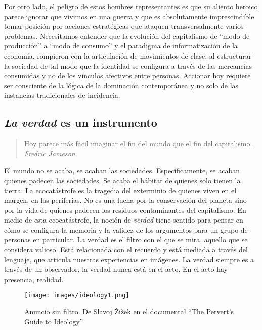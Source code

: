 Por otro lado, el peligro de estos hombres representantes es que su aliento heroico parece ignorar que vivimos en una guerra y que es absolutamente imprescindible tomar posición por acciones estratégicas que ataquen transversalmente varios problemas. Necesitamos entender que la evolución del capitalismo de \enquote{modo de producción}\revquotes{} a \enquote{modo de consumo}\revquotes{} y el paradigma de informatización de la economía, rompieron con la articulación de movimientos de clase, al estructurar la sociedad de tal modo que la identidad se configura a través de las mercancías consumidas y no de los vínculos afectivos entre personas. Accionar hoy requiere ser consciente de la lógica de la dominación contemporánea y no solo de las instancias tradicionales de incidencia.

\subsection{\emph{La verdad} es un instrumento}
\label{sub:verdadinstrumental}

\begin{quote}
	Hoy parece más fácil imaginar el fin del mundo que el fin del
	capitalismo.\\ \emph{Fredric Jameson}.
\end{quote}

El mundo no se acaba, se acaban las sociedades. Específicamente, se acaban quienes padecen las sociedades. Se acaba el hábitat de quienes solo tienen la tierra. La ecocatástrofe es la tragedia del exterminio de quienes viven en el margen, en las periferias. No es una lucha por la conservación del planeta sino por la vida de quienes padecen los residuos contaminantes del capitalismo. En medio de esta ecocatástrofe, la noción de \emph{verdad} tiene sentido para pensar en cómo se configura la memoria y la validez de los argumentos para un grupo de personas en particular. La verdad es el filtro con el que se mira, aquello que se considera valioso. Está relacionada con el recuerdo y está mediada a través del lenguaje, que articula nuestras experiencias en imágenes. La verdad siempre es a través de un observador, la verdad nunca está en el acto. En el acto hay presencia, realidad.

\begin{figure}[htbp]
	\centering
	\texttt{[image: images/ideology1.png]}
	\caption[Anuncio sin filtro.]{Anuncio sin filtro. De Slavoj Žižek en el documental \enquote{The Pervert's Guide to Ideology}}
\end{figure}

